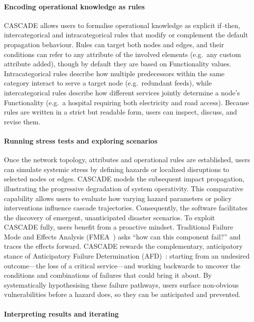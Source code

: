 \documentclass[review,12pt]{elsarticle}
\begin{document}
\paragraph{Encoding operational knowledge as rules}
CASCADE allows users to formalise operational knowledge as explicit if--then, intercategorical and intracategorical rules that modify or complement the default propagation behaviour. Rules can target both nodes and edges, and their conditions can refer to any attribute of the involved elements (e.g.\ any custom attribute added), though by default they are based on Functionality values. Intracategorical rules describe how multiple predecessors within the same category interact to serve a target node (e.g.\ redundant feeds), while intercategorical rules describe how different services jointly determine a node's Functionality (e.g.\ a hospital requiring both electricity and road access). Because rules are written in a strict but readable form, users can inspect, discuss, and revise them.

\paragraph{Running stress tests and exploring scenarios}
Once the network topology, attributes and operational rules are established, users can simulate systemic stress by defining hazards or localized disruptions to selected nodes or edges. CASCADE models the subsequent impact propagation, illustrating the progressive degradation of system operativity. This comparative capability allows users to evaluate how varying hazard parameters or policy interventions influence cascade trajectories. Consequently, the software facilitates the discovery of emergent, unanticipated disaster scenarios. To exploit CASCADE fully, users benefit from a proactive mindset. Traditional Failure Mode and Effects Analysis (FMEA~\cite{huang_failure_2020}) asks ``how can this component fail?'' and traces the effects forward. CASCADE rewards the complementary, anticipatory stance of Anticipatory Failure Determination (AFD)~\cite{da_silva_anticipatory_2019, zio2016challenges}: starting from an undesired outcome---the loss of a critical service---and working backwards to uncover the conditions and combinations of failures that could bring it about. By systematically hypothesising these failure pathways, users surface non-obvious vulnerabilities before a hazard does, so they can be anticipated and prevented.

\paragraph{Interpreting results and iterating}
\end{document}
